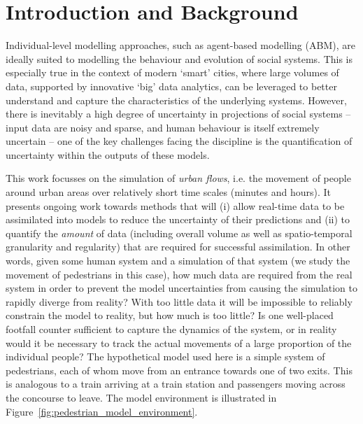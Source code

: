 \documentclass[runningheads]{llncs}
\begin{document}
\section{Introduction and Background}

Individual-level modelling approaches, such as agent-based modelling (ABM), are ideally suited to modelling the behaviour and evolution of social systems. This is especially true in the context of modern `smart' cities, where large volumes of data, supported by innovative `big' data analytics, can be leveraged to better understand and capture the characteristics of the underlying systems. However, there is inevitably a high degree of uncertainty in projections of social systems -- input data are noisy and sparse, and human behaviour is itself extremely uncertain -- one of the key challenges facing the discipline is the quantification of uncertainty within the outputs of these models.

This work focusses on the simulation of \textit{urban flows}, i.e. the movement of people around urban areas over relatively short time scales (minutes and hours). It presents ongoing work towards methods that will (i) allow real-time data to be assimilated into models to reduce the uncertainty of their predictions and (ii) to quantify the \textit{amount} of data (including overall volume as well as spatio-temporal granularity and regularity) that are required for successful assimilation. In other words, given some human system and a simulation of that system (we study the movement of pedestrians in this case), how much data are required from the real system in order to prevent the model uncertainties from causing the simulation to rapidly diverge from reality? With too little data it will be impossible to reliably constrain the model to reality, but how much is too little? Is one well-placed footfall counter sufficient to capture the dynamics of the system, or in reality would it be necessary to track the actual movements of a large proportion of the individual people? The hypothetical model used here is a simple system of pedestrians, each of whom move from an entrance towards one of two exits. This is analogous to a train arriving at a train station and passengers moving across the concourse to leave. The model environment is illustrated in Figure~\ref{fig:pedestrian_model_environment}. 
\end{document}
